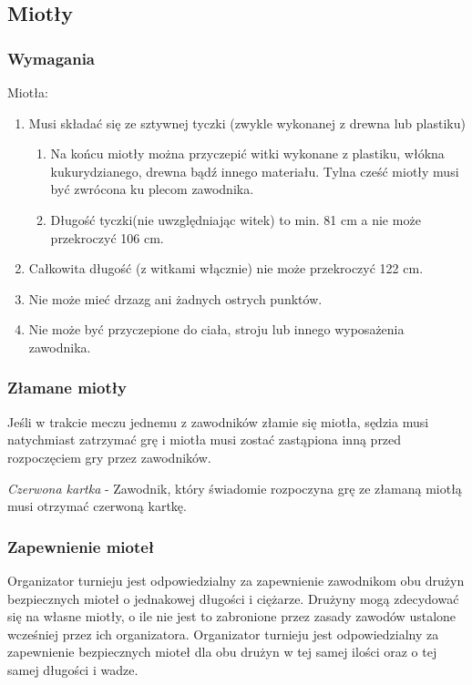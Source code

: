 \documentclass[12pt]{article}
\begin{document}
\subsection{Miotły}

\subsubsection{Wymagania}
Miotła:

\begin{enumerate}
	\item
	      Musi składać się ze sztywnej tyczki (zwykle wykonanej z drewna lub
	      plastiku)

	      \begin{enumerate}
		      \item
		            Na końcu miotły można przyczepić witki wykonane z plastiku, włókna
		            kukurydzianego, drewna bądź innego materiału. Tylna cześć miotły
		            musi być zwrócona ku plecom zawodnika.
		      \item
		            Długość tyczki(nie uwzględniając witek) to min. 81 cm a nie może
		            przekroczyć 106 cm.
	      \end{enumerate}
	\item
	      Całkowita długość (z witkami włącznie) nie może przekroczyć 122 cm.
	\item
	      Nie może mieć drzazg ani żadnych ostrych punktów.
	\item
	      Nie może być przyczepione do ciała, stroju lub innego wyposażenia
	      zawodnika.
\end{enumerate}

\subsubsection{Złamane miotły}
Jeśli w trakcie meczu jednemu z
zawodników złamie się miotła, sędzia musi natychmiast zatrzymać grę i
miotła musi zostać zastąpiona inną przed rozpoczęciem gry przez
zawodników.

\emph{Czerwona kartka} - Zawodnik, który świadomie rozpoczyna grę ze
złamaną miotłą musi otrzymać czerwoną kartkę.

\subsubsection{Zapewnienie mioteł}
Organizator turnieju jest odpowiedzialny za zapewnienie zawodnikom obu
drużyn bezpiecznych mioteł o jednakowej długości i ciężarze. Drużyny
mogą zdecydować się na własne miotły, o ile nie jest to zabronione przez
zasady zawodów ustalone wcześniej przez ich organizatora. Organizator
turnieju jest odpowiedzialny za zapewnienie bezpiecznych mioteł dla obu
drużyn w tej samej ilości oraz o tej samej długości i wadze.
\end{document}
